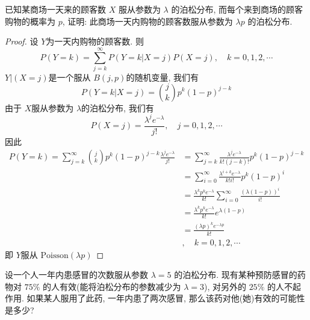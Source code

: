 \documentclass[../main.tex]{subfiles}
\begin{document}
\begin{exercise}{}{}
已知某商场一天来的顾客数 $X$ 服从参数为 $\lambda$ 的泊松分布, 而每个来到商场的顾客购物的概率为 $p$, 证明: 此商场一天内购物的顾客数服从参数为 $\lambda p$ 的泊松分布.
\end{exercise}
\begin{proof}
   设 \(  Y  \)为一天内购物的顾客数. 则 \[
   P\left( Y= k \right)= \sum _{j= k}^{\infty}P\left( Y= k| X= j \right)P\left( X= j \right)    ,\quad k= 0,1,2,\cdots 
   \]  \(  Y|\left( X= j \right)   \)是一个服从 \(  B\left( j,p \right)   \)的随机变量, 我们有 \[
   P\left( Y= k|X= j \right)= \binom{ j }{k  }p^{k}\left( 1-p \right)^{j-k}   
   \]由于 \(  X  \)服从参数为 \(   \lambda   \)的泊松分布, 我们有 \[
   P\left( X= j \right)=  \frac{ \lambda ^{j} e^{- \lambda }}{j! } ,\quad j= 0,1,2,\cdots 
   \]  因此 \[
  \begin{aligned}
   P\left( Y= k \right)= \sum _{j= k}^{\infty}\binom{ j }{k  }p^{k}\left( 1-p \right)^{j-k} \frac{ \lambda ^{j} e^{- \lambda }}{j! }  &  = \sum _{j= k}^{\infty}\frac{ \lambda ^{j}e^{- \lambda }}{k!\left( j-k \right)!  }p^{k}\left( 1-p \right)^{j-k}   \\ 
    &= \sum _{i= 0}^{\infty}\frac{ \lambda ^{i+ k}e^{- \lambda } }{k! i! }p^{k}\left( 1-p \right)^{i}  \\ 
     &= \frac{ \lambda ^{k}p^{k}e^{- \lambda } }{k! }\sum _{i= 0}^{\infty}\frac{\left( \lambda \left( 1-p \right) \right)^{i}  }{i! }\\ 
      &= \frac{ \lambda ^{k}p^{k}e^{- \lambda } }{k! } e^{ \lambda \left( 1-p \right) }   \\ 
       &= \frac{\left(  \lambda p \right)^{k} e^{- \lambda p}  }{k! } \\ 
        &,\quad k= 0,1,2,\cdots 
  \end{aligned}
   \]即 \(  Y  \)服从 \(  \mathrm{Poisson}\left(  \lambda p\right)   \)  
\end{proof}
\begin{exercise}{}{}
设一个人一年内患感冒的次数服从参数 $\lambda = 5$ 的泊松分布. 现有某种预防感冒的药物对 $75\%$ 的人有效(能将泊松分布的参数减少为 $\lambda = 3$), 对另外的 $25\%$ 的人不起作用. 如果某人服用了此药, 一年内患了两次感冒, 那么该药对他(她)有效的可能性是多少?
\end{exercise}
\end{document}

